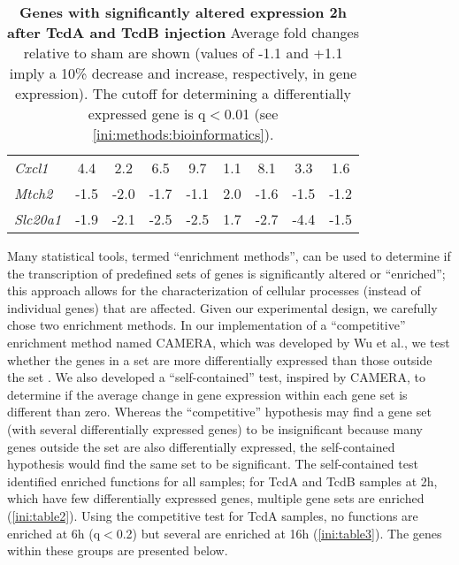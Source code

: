 \begin{table}[h!]
\begin{center}
\begin{tabular}{ l c c c | c c c | c c }
\textit{Cxcl1} & 4.4 & 2.2 & 6.5 & 9.7 & 1.1 & 8.1 & 3.3 & 1.6 \\
\textit{Mtch2} & -1.5 & -2.0 & -1.7 & -1.1 & 2.0 & -1.6 & -1.5 & -1.2 \\
\textit{Slc20a1} & -1.9 & -2.1 & -2.5 & -2.5 & 1.7 & -2.7 & -4.4 & -1.5 \\
\end{tabular}
\caption[Genes with significantly altered expression 2h after TcdA or TcdB injection]{
 \textbf{Genes with significantly altered expression 2h after TcdA and TcdB injection}
Average fold changes relative to sham are shown (values of -1.1 and +1.1 
imply a 10\% decrease and increase, respectively, in gene expression). 
The cutoff for determining a differentially expressed gene is q$<$0.01 
(see \ref{ini:methods:bioinformatics}). }
\label{ini:table1}
\end{center}
\end{table}


Many statistical tools, termed ``enrichment methods'', can be used 
to determine if the transcription of predefined sets of genes is 
significantly altered or ``enriched''; this approach allows for the 
characterization of cellular processes (instead of individual genes) 
that are affected. Given our experimental design, we carefully 
chose two enrichment methods. In our implementation of a ``competitive'' 
enrichment method named CAMERA, which was developed by Wu et al., we test 
whether the genes in a set are more differentially expressed than those 
outside the set \cite{Wu:2012kp}. We also developed a ``self-contained'' 
test, inspired by CAMERA, to determine if the average change in gene 
expression within each gene set is different than zero. Whereas the 
``competitive'' hypothesis may find a gene set (with several differentially 
expressed genes) to be insignificant because many genes outside the 
set are also differentially expressed, the self-contained hypothesis 
would find the same set to be significant. The self-contained test 
identified enriched functions for all samples; for TcdA and TcdB 
samples at 2h, which have few differentially expressed genes, multiple 
gene sets are enriched (\autoref{ini:table2}). Using the competitive 
test for TcdA samples, no functions are enriched at 6h (q$<$0.2) but 
several are enriched at 16h (\autoref{ini:table3}). The genes within 
these groups are presented below.

